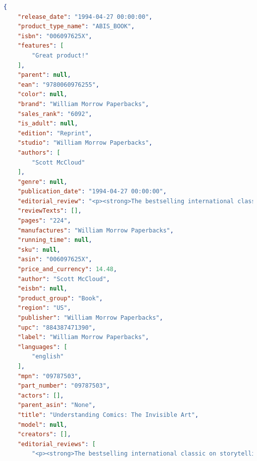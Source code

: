 \documentclass[LaM,binding=0.6cm]{sapthesis}
\begin{document}
\begin{lstlisting}[language=json,firstnumber=1]
{
    "release_date": "1994-04-27 00:00:00", 
    "product_type_name": "ABIS_BOOK", 
    "isbn": "006097625X", 
    "features": [
        "Great product!"
    ], 
    "parent": null, 
    "ean": "9780060976255", 
    "color": null, 
    "brand": "William Morrow Paperbacks", 
    "sales_rank": "6092", 
    "is_adult": null, 
    "edition": "Reprint", 
    "studio": "William Morrow Paperbacks", 
    "authors": [
        "Scott McCloud"
    ], 
    "genre": null, 
    "publication_date": "1994-04-27 00:00:00", 
    "editorial_review": "<p><strong>The bestselling international classic on storytelling and visual communication</strong></p><p><strong>\"You must read this book.\" </strong>\u2014<strong>\u00a0Neil Gaiman</strong></p><p>Praised throughout the cartoon industry by such luminaries as Art Spiegelman, Matt Groening, and Will Eisner,\u00a0Scott McCloud's <em>Understanding Comics</em>\u00a0is\u00a0a seminal examination of comics art: its rich\u00a0history, surprising\u00a0technical components, and major cultural significance.\u00a0Explore the secret world between the panels, through the lines, and within the hidden symbols of a powerful but misunderstood art form.</p>", 
    "reviewTexts": [], 
    "pages": "224", 
    "manufactures": "William Morrow Paperbacks", 
    "running_time": null, 
    "sku": null, 
    "asin": "006097625X", 
    "price_and_currency": 14.48, 
    "author": "Scott McCloud", 
    "eisbn": null, 
    "product_group": "Book", 
    "region": "US", 
    "publisher": "William Morrow Paperbacks", 
    "upc": "884387471390", 
    "label": "William Morrow Paperbacks", 
    "languages": [
        "english"
    ], 
    "mpn": "09787503", 
    "part_number": "09787503", 
    "actors": [], 
    "parent_asin": "None", 
    "title": "Understanding Comics: The Invisible Art", 
    "model": null, 
    "creators": [], 
    "editorial_reviews": [
        "<p><strong>The bestselling international classic on storytelling and visual communication</strong></p><p><strong>\"You must read this book.\" </strong>\u2014<strong>\u00a0Neil Gaiman</strong></p><p>Praised throughout the cartoon industry by such luminaries as Art Spiegelman, Matt Groening, and Will Eisner,\u00a0Scott McCloud's <em>Understanding Comics</em>\u00a0is\u00a0a seminal examination of comics art: its rich\u00a0history, surprising\u00a0technical components, and major cultural significance.\u00a0Explore the secret world between the panels, through the lines, and within the hidden symbols of a powerful but misunderstood art form.</p>", 

\end{lstlisting}
\end{document}
